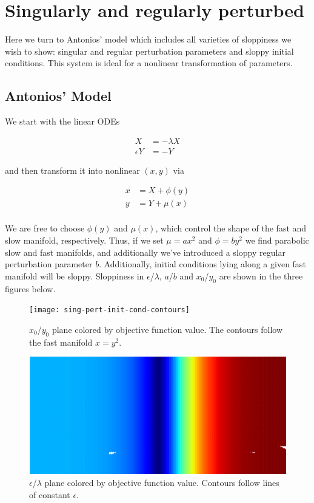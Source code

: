 \documentclass[11pt]{article}
\begin{document}
\section{Singularly and regularly perturbed}

Here we turn to Antonios' model which includes all varieties of sloppiness we wish to show: singular and regular perturbation parameters and sloppy initial conditions. This system is ideal for a nonlinear transformation of parameters.

\subsection{Antonios' Model}

We start with the linear ODEs

\begin{align*}
  X &= -\lambda X \\
  \epsilon Y &= -Y
\end{align*}

and then transform it into nonlinear $(x, y)$ via 

\begin{align*}
  x &= X + \phi(y) \\
  y &= Y + \mu(x) \\
\end{align*}

We are free to choose $\phi(y)$ and $\mu(x)$, which control the shape of the fast and slow manifold, respectively. Thus, if we set $\mu = a x^2$ and $\phi = b y^2$ we find parabolic slow and fast manifolds, and additionally we've introduced a sloppy regular perturbation parameter $b$. Additionally, initial conditions lying along a given fast manifold will be sloppy. Sloppiness in $\epsilon$/$\lambda$, $a$/$b$ and $x_0$/$y_0$ are shown in the three figures below.

\begin{figure}[htbp]
  \centering
  \texttt{[image: sing-pert-init-cond-contours]}
  \caption{$x_0$/$y_0$ plane colored by objective function value. The contours follow the fast manifold $x=y^2$.}
\end{figure}

\begin{figure}[htbp]
  \centering
  \includegraphics[width=\linewidth]{zagaris-le-contours}
  \caption{$\epsilon$/$\lambda$ plane colored by objective function value. Contours follow lines of constant $\epsilon$.}
\end{figure}
\end{document}
